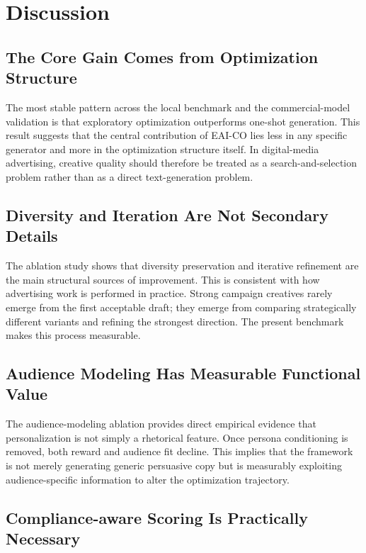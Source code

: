 \documentclass[preprint,12pt]{elsarticle}
\begin{document}
\section{Discussion}

\subsection{The Core Gain Comes from Optimization Structure}

The most stable pattern across the local benchmark and the commercial-model validation is that exploratory optimization outperforms one-shot generation. This result suggests that the central contribution of EAI-CO lies less in any specific generator and more in the optimization structure itself. In digital-media advertising, creative quality should therefore be treated as a search-and-selection problem rather than as a direct text-generation problem.

\subsection{Diversity and Iteration Are Not Secondary Details}

The ablation study shows that diversity preservation and iterative refinement are the main structural sources of improvement. This is consistent with how advertising work is performed in practice. Strong campaign creatives rarely emerge from the first acceptable draft; they emerge from comparing strategically different variants and refining the strongest direction. The present benchmark makes this process measurable.

\subsection{Audience Modeling Has Measurable Functional Value}

The audience-modeling ablation provides direct empirical evidence that personalization is not simply a rhetorical feature. Once persona conditioning is removed, both reward and audience fit decline. This implies that the framework is not merely generating generic persuasive copy but is measurably exploiting audience-specific information to alter the optimization trajectory.

\subsection{Compliance-aware Scoring Is Practically Necessary}
\end{document}
